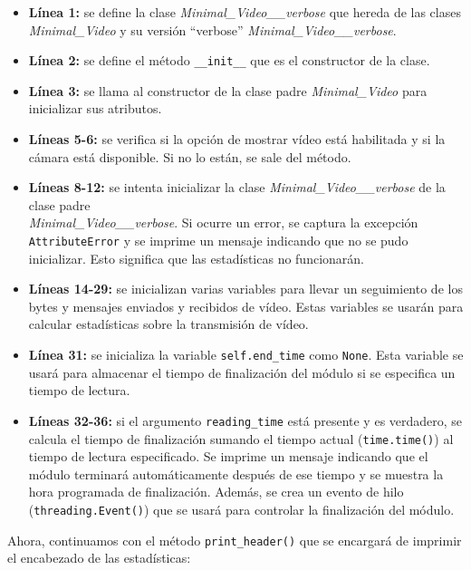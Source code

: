 \begin{itemize}
    \item \textbf{Línea 1:} se define la clase \textit{Minimal\_Video\_\_verbose} que hereda de las clases \textit{Minimal\_Video} y su versión ``verbose'' \textit{Minimal\_Video\_\_verbose}.
    \item \textbf{Línea 2:} se define el método \texttt{\_\_init\_\_} que es el constructor de la clase.
    \item \textbf{Línea 3:} se llama al constructor de la clase padre \textit{Minimal\_Video} para inicializar sus atributos.
    \item \textbf{Líneas 5-6:} se verifica si la opción de mostrar vídeo está habilitada y si la cámara está disponible. Si no lo están, se sale del método.
    \item \textbf{Líneas 8-12:} se intenta inicializar la clase \textit{Minimal\_Video\_\_verbose} de la clase padre \\
    \textit{Minimal\_Video\_\_verbose}. Si ocurre un error, se captura la excepción \texttt{AttributeError} y se imprime un mensaje indicando que no se pudo inicializar. Esto significa que las estadísticas no funcionarán.
    \item \textbf{Líneas 14-29:} se inicializan varias variables para llevar un seguimiento de los bytes y mensajes enviados y recibidos de vídeo. Estas variables se usarán para calcular estadísticas sobre la transmisión de vídeo.
    \item \textbf{Línea 31:} se inicializa la variable \texttt{self.end\_time} como \texttt{None}. Esta variable se usará para almacenar el tiempo de finalización del módulo si se especifica un tiempo de lectura.
    \item \textbf{Líneas 32-36:} si el argumento \texttt{reading\_time} está presente y es verdadero, se calcula el tiempo de finalización sumando el tiempo actual (\texttt{time.time()}) al tiempo de lectura especificado. Se imprime un mensaje indicando que el módulo terminará automáticamente después de ese tiempo y se muestra la hora programada de finalización. Además, se crea un evento de hilo (\texttt{threading.Event()}) que se usará para controlar la finalización del módulo.
\end{itemize}

Ahora, continuamos con el método \texttt{print\_header()} que se encargará de imprimir el encabezado de las estadísticas:

